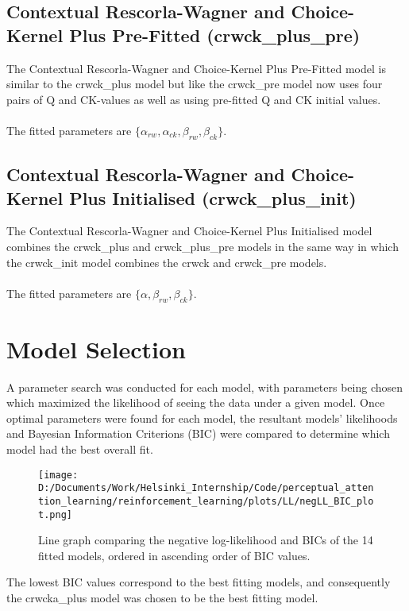 \documentclass[12pt]{article}
\begin{document}
\subsection{Contextual Rescorla-Wagner and Choice-Kernel Plus Pre-Fitted (crwck\_plus\_pre)}
The Contextual Rescorla-Wagner and Choice-Kernel Plus Pre-Fitted model is similar to the crwck\_plus model but like the crwck\_pre model now uses four pairs of Q and CK-values as well as using pre-fitted Q and CK initial values.
\\\\
The fitted parameters are $\{\alpha_{rw},\alpha_{ck}, \beta_{rw}, \beta_{ck}\}$.
 
 \subsection{Contextual Rescorla-Wagner and Choice-Kernel Plus Initialised (crwck\_plus\_init)}
 The Contextual Rescorla-Wagner and Choice-Kernel Plus Initialised model combines the crwck\_plus and crwck\_plus\_pre models in the same way in which the crwck\_init model combines the crwck and crwck\_pre models.\\\\
 The fitted parameters are $\{\alpha, \beta_{rw}, \beta_{ck}\}$.
\newpage

\section{Model Selection}
A parameter search was conducted for each model, with parameters being chosen which maximized the likelihood of seeing the data under a given model. Once optimal parameters were found for each model, the resultant models' likelihoods and Bayesian Information Criterions (BIC) were compared to determine which model had the best overall fit.

\begin{figure}[h]  %
	\centering
	\texttt{[image: D:/Documents/Work/Helsinki\_Internship/Code/perceptual\_attention\_learning/reinforcement\_learning/plots/LL/negLL\_BIC\_plot.png]}  %
	\caption{Line graph comparing the negative log-likelihood and BICs of the 14 fitted models, ordered in ascending order of BIC values.}
	\label{fig:internalenvironment}
\end{figure} 

The lowest BIC values correspond to the best fitting models, and consequently the crwcka\_plus model was chosen to be the best fitting model.
\end{document}
